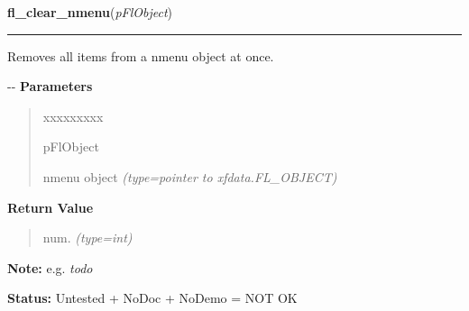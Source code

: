     \label{xformslib:flnmenu:fl_clear_nmenu}

    \vspace{0.5ex}

\hspace{.8\funcindent}\begin{boxedminipage}{\funcwidth}

    \raggedright \textbf{fl\_clear\_nmenu}(\textit{pFlObject})

    \vspace{-1.5ex}

    \rule{\textwidth}{0.5\fboxrule}
\setlength{\parskip}{2ex}

Removes all items from a nmenu object at once.

-{}-
\setlength{\parskip}{1ex}
      \textbf{Parameters}
      \vspace{-1ex}

      \begin{quote}
        \begin{Ventry}{xxxxxxxxx}

          \item[pFlObject]


nmenu object
            {\it (type=pointer to xfdata.FL\_OBJECT)}

        \end{Ventry}

      \end{quote}

      \textbf{Return Value}
    \vspace{-1ex}

      \begin{quote}

num.
      {\it (type=int)}

      \end{quote}

\textbf{Note:} 
e.g. \emph{todo}


\textbf{Status:} 
Untested + NoDoc + NoDemo = NOT OK


    \end{boxedminipage}

    \label{xformslib:flnmenu:fl_add_nmenu_items}

    \vspace{0.5ex}

